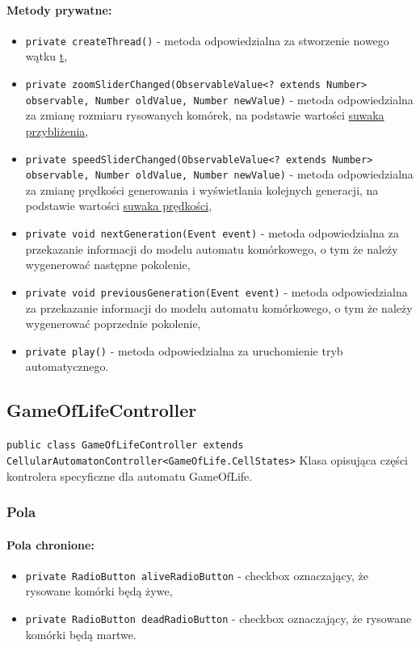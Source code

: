 \documentclass{report}
\begin{document}
\paragraph{Metody prywatne:}
\begin{itemize}
 	\item \texttt{private createThread()} - metoda odpowiedzialna za stworzenie nowego wątku \hyperref[sec:thread]{t},
 	\item \texttt{private zoomSliderChanged(ObservableValue<? extends Number> observable, Number oldValue, Number newValue)} - metoda odpowiedzialna za zmianę rozmiaru rysowanych komórek, na podstawie wartości \hyperref[sec:zoomSlider]{suwaka przybliżenia},
 	\item \texttt{private speedSliderChanged(ObservableValue<? extends Number> observable, Number oldValue, Number newValue)} - metoda odpowiedzialna za zmianę prędkości generowania i wyświetlania kolejnych generacji, na podstawie wartości \hyperref[sec:speedSlider]{suwaka prędkości},
 	\item \texttt{private void nextGeneration(Event event)} - metoda odpowiedzialna za przekazanie informacji do modelu automatu komórkowego, o tym że należy wygenerować następne pokolenie,
 	\item \texttt{private void previousGeneration(Event event)} - metoda odpowiedzialna za przekazanie informacji do modelu automatu komórkowego, o tym że należy wygenerować poprzednie pokolenie,
 	\item \texttt{private play()} - metoda odpowiedzialna za uruchomienie tryb automatycznego.
\end{itemize}

\subsection{GameOfLifeController}
\texttt{public class GameOfLifeController extends CellularAutomatonController<GameOfLife.CellStates>}
Klasa opisująca części kontrolera specyficzne dla automatu GameOfLife.
\subsubsection{Pola}
\paragraph{Pola chronione:}
\begin{itemize}	\label{sec:checkbox}
	\item \texttt{private RadioButton aliveRadioButton} - checkbox oznaczający, że rysowane komórki będą żywe,
	\item \texttt{private RadioButton deadRadioButton} - checkbox oznaczający, że rysowane komórki będą martwe.
\end{itemize}
\end{document}
